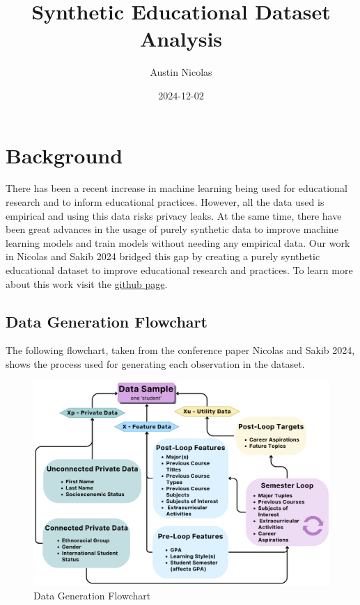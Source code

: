 \documentclass[
  twocolumn]{article}
\title{Synthetic Educational Dataset Analysis}
\author{Austin Nicolas}
\date{2024-12-02}
\begin{document}
\maketitle

{
\setcounter{tocdepth}{2}
\tableofcontents
}
\section{Background}\label{background}

There has been a recent increase in machine learning being used for
educational research and to inform educational practices. However, all
the data used is empirical and using this data risks privacy leaks. At
the same time, there have been great advances in the usage of purely
synthetic data to improve machine learning models and train models
without needing any empirical data. Our work in Nicolas and Sakib 2024
bridged this gap by creating a purely synthetic educational dataset to
improve educational research and practices. To learn more about this
work visit the
\href{https://github.com/austineamonn/SummerResearch2024}{github page}.

\subsection{Data Generation Flowchart}\label{data-generation-flowchart}

The following flowchart, taken from the conference paper Nicolas and
Sakib 2024, shows the process used for generating each observation in
the dataset.

\begin{figure}
\centering
\includegraphics{data_generation_flowchart.png}
\caption{Data Generation Flowchart}
\end{figure}
\end{document}
